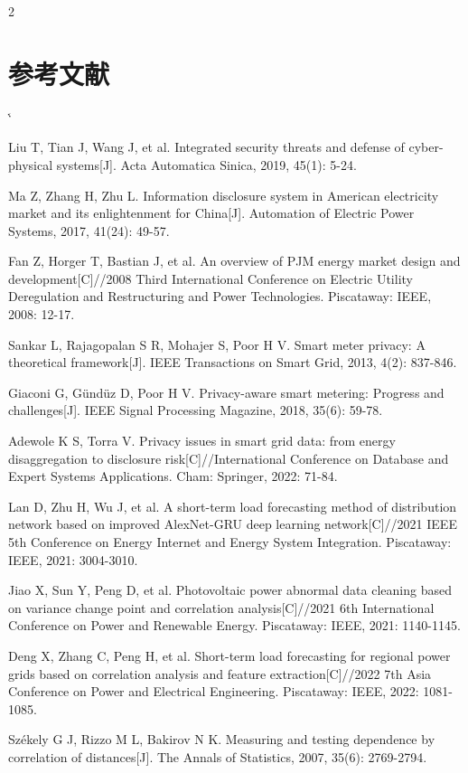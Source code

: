 \documentclass[UTF8,zihao=5,twoside]{ctexart}
\makeatletter
\numberwithin{equation}{section}
\renewcommand{\refname}{参考文献}
\renewenvironment{thebibliography}[1]{%
  \section*{\refname}%
  \small
  \list{[\arabic{enumi}]}{%
    \settowidth\labelwidth{[#1]}%
    \leftmargin\labelwidth
    \advance\leftmargin\labelsep
    \usecounter{enumi}}
  \sloppy\clubpenalty4000\widowpenalty4000\sfcode`\.\@m
}{\def\@noitemerr{\@latex@warning{Empty `thebibliography' environment}}\endlist}
\makeatother
\begin{document}
\begin{multicols}{2}
\balance
\begin{thebibliography}{99}
Liu T, Tian J, Wang J, et al. Integrated security threats and defense of cyber-physical systems[J]. Acta Automatica Sinica, 2019, 45(1): 5-24.

Ma Z, Zhang H, Zhu L. Information disclosure system in American electricity market and its enlightenment for China[J]. Automation of Electric Power Systems, 2017, 41(24): 49-57.

Fan Z, Horger T, Bastian J, et al. An overview of PJM energy market design and development[C]//2008 Third International Conference on Electric Utility Deregulation and Restructuring and Power Technologies. Piscataway: IEEE, 2008: 12-17.

Sankar L, Rajagopalan S R, Mohajer S, Poor H V. Smart meter privacy: A theoretical framework[J]. IEEE Transactions on Smart Grid, 2013, 4(2): 837-846.

Giaconi G, Gündüz D, Poor H V. Privacy-aware smart metering: Progress and challenges[J]. IEEE Signal Processing Magazine, 2018, 35(6): 59-78.

Adewole K S, Torra V. Privacy issues in smart grid data: from energy disaggregation to disclosure risk[C]//International Conference on Database and Expert Systems Applications. Cham: Springer, 2022: 71-84.

Lan D, Zhu H, Wu J, et al. A short-term load forecasting method of distribution network based on improved AlexNet-GRU deep learning network[C]//2021 IEEE 5th Conference on Energy Internet and Energy System Integration. Piscataway: IEEE, 2021: 3004-3010.

Jiao X, Sun Y, Peng D, et al. Photovoltaic power abnormal data cleaning based on variance change point and correlation analysis[C]//2021 6th International Conference on Power and Renewable Energy. Piscataway: IEEE, 2021: 1140-1145.

Deng X, Zhang C, Peng H, et al. Short-term load forecasting for regional power grids based on correlation analysis and feature extraction[C]//2022 7th Asia Conference on Power and Electrical Engineering. Piscataway: IEEE, 2022: 1081-1085.

Székely G J, Rizzo M L, Bakirov N K. Measuring and testing dependence by correlation of distances[J]. The Annals of Statistics, 2007, 35(6): 2769-2794.


\end{thebibliography}
\end{multicols}
\end{document}
